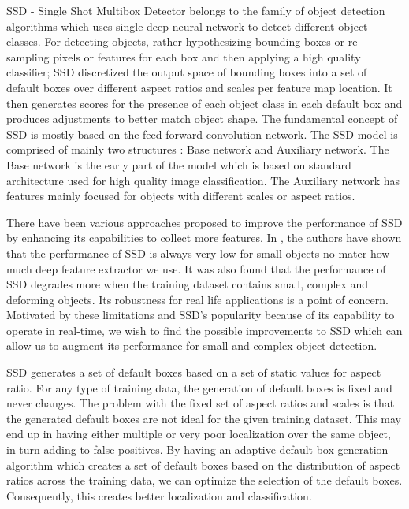 \documentclass[conference]{IEEEtran}
\begin{document}
SSD - Single Shot Multibox Detector \cite{DBLP:journals/corr/LiuAESR15} belongs to the family of object detection algorithms which uses single deep neural network to detect different object classes. For detecting objects, rather hypothesizing bounding boxes or re-sampling pixels or features for each box and then applying a high quality classifier; SSD discretized the output space of bounding boxes into a set of default boxes over different aspect ratios and scales per feature map location. It then generates scores for the presence of each object class in each default box and produces adjustments to better match object shape. The fundamental concept of SSD is mostly based on the feed forward convolution network. The SSD model is comprised of mainly two structures : Base network and Auxiliary network. The Base network is the early part of the model which is based on standard architecture used for high quality image classification. The Auxiliary network has features mainly focused for objects with different scales or aspect ratios. 

There have been various approaches \cite{DBLP:journals/corr/JeongPK17,DBLP:journals/corr/abs-1709-05054,DBLP:journals/corr/FuLRTB17} proposed to improve the performance of SSD by enhancing its capabilities to collect more features. In \cite{DBLP:journals/corr/HuangRSZKFFWSG016}, the authors have shown that the performance of SSD is always very low for small objects no mater how much deep feature extractor we use. It was also found that the performance of SSD degrades more when the training dataset contains small, complex and deforming objects. Its robustness for real life applications is a point of concern. Motivated by these limitations and SSD's popularity because of its capability to operate in real-time, we wish to find the possible improvements to SSD which can allow us to augment its performance for small and complex object detection. 

SSD generates a set of default boxes based on a set of static values for aspect ratio. For any type of training data, the generation of default boxes is fixed and never changes. The problem with the fixed set of aspect ratios and scales is that the generated default boxes are not ideal for the given training dataset. This may end up in having either multiple or very poor localization over the same object, in turn adding to false positives. By having an adaptive default box generation algorithm which creates a set of default boxes based on the distribution of aspect ratios across the training data, we can optimize the selection of the default boxes. Consequently, this creates better localization and classification.
\end{document}
